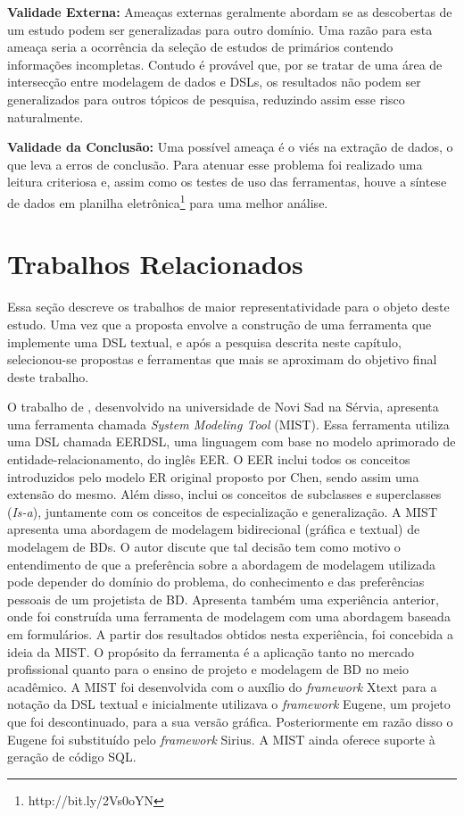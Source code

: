 \textbf{Validade Externa:}
Ameaças externas geralmente abordam se as descobertas de um estudo podem ser generalizadas para outro domínio. 
Uma razão para esta ameaça seria a ocorrência da seleção de estudos de primários contendo informações incompletas. 
Contudo é provável que, por se tratar de uma área de intersecção entre modelagem de dados e \acp{DSL}, os resultados não podem ser generalizados para outros tópicos de pesquisa, reduzindo assim esse risco naturalmente.

\textbf{Validade da Conclusão:}
Uma possível ameaça é o viés na extração de dados, o que leva a erros de conclusão.
Para atenuar esse problema foi realizado uma leitura criteriosa e, assim como os testes de uso das ferramentas, houve a síntese de dados em planilha eletrônica\footnote{http://bit.ly/2Vs0oYN} para uma melhor análise.

\section{Trabalhos Relacionados} \label{sec:TrabRelacionados}

Essa seção descreve os trabalhos de maior representatividade para o objeto deste estudo. 
Uma vez que a proposta envolve a construção de uma ferramenta que implemente uma \ac{DSL} textual, e após a pesquisa descrita neste capítulo, selecionou-se propostas e ferramentas que mais se aproximam do objetivo final deste trabalho.

O trabalho de , desenvolvido na universidade de Novi Sad na Sérvia, apresenta uma ferramenta chamada \textit{System Modeling Tool} (MIST). 
Essa ferramenta utiliza uma \ac{DSL} chamada EERDSL, uma linguagem com base no modelo aprimorado de entidade-relacionamento, do inglês \ac{EER}.
O \ac{EER} inclui todos os conceitos introduzidos pelo modelo \ac{ER} original proposto por Chen, sendo assim uma extensão do mesmo. 
Além disso, inclui os conceitos de subclasses e superclasses (\textit{Is-a}), juntamente com os conceitos de especialização e generalização.
A MIST apresenta uma abordagem de modelagem bidirecional (gráfica e textual) de modelagem de \acp{BD}. 
O autor discute que tal decisão tem como motivo o entendimento de que a preferência sobre a abordagem de modelagem utilizada pode depender do domínio do problema, do conhecimento e das preferências pessoais de um projetista de \ac{BD}. 
Apresenta também uma experiência anterior, onde foi construída uma ferramenta de modelagem com uma abordagem baseada em formulários. 
A partir dos resultados obtidos nesta experiência, foi concebida a ideia da MIST. 
O propósito da ferramenta é a aplicação tanto no mercado profissional quanto para o ensino de projeto e modelagem de \ac{BD} no meio acadêmico. 
A MIST foi desenvolvida com o auxílio do \textit{framework} Xtext para a notação da \ac{DSL} textual e inicialmente utilizava o \textit{framework} Eugene, um projeto que foi descontinuado, para a sua versão gráfica. 
Posteriormente em razão disso o Eugene foi substituído pelo \textit{framework} Sirius. 
A MIST ainda oferece suporte à geração de código \ac{SQL}.

